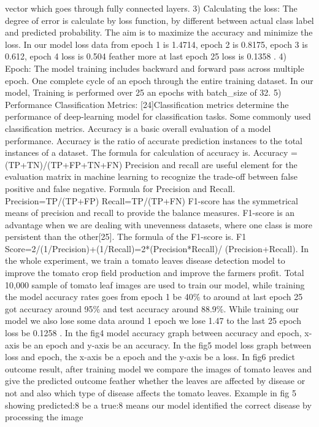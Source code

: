 \documentclass[conference]{IEEEtran}
\begin{document}
vector which goes through fully connected layers. 3) Calculating the loss: The degree of error is calculate by loss function, by different between actual class label and predicted probability. The aim is to maximize the accuracy and minimize the loss. In our model loss data from epoch 1 is 1.4714, epoch 2 is 0.8175, epoch 3 is 0.612, epoch 4 loss is 0.504 feather more at last epoch 25 loss is 0.1358 . 4) Epoch: The model training includes backward and forward pass across multiple epoch. One complete cycle of an epoch through the entire training dataset. In our model, Training is performed over 25 an epochs with batch\_size of 32. 5) Performance Classification Metrics: [24]Classification metrics determine the performance of deep-learning model for classification tasks. Some commonly used classification metrics. Accuracy is a basic overall evaluation of a model performance. Accuracy is the ratio of accurate prediction instances to the total instances of a dataset. The formula for calculation of accuracy is. Accuracy = (TP+TN)/(TP+FP+TN+FN) Precision and recall are useful element for the evaluation matrix in machine learning to recognize the trade-off between false positive and false negative. Formula for Precision and Recall. Precision=TP/(TP+FP) Recall=TP/(TP+FN) F1-score has the symmetrical means of precision and recall to provide the balance measures. F1-score is an advantage when we are dealing with unevenness datasets, where one class is more persistent than the other[25]. The formula of the F1-score is. F1 Score=2/(1/Precision)+(1/Recall)=2*(Precision*Recall)/ (Precision+Recall). In the whole experiment, we train a tomato leaves disease detection model to improve the tomato crop field production and improve the farmers profit. Total 10,000 sample of tomato leaf images are used to train our model, while training the model accuracy rates goes from epoch 1 be 40\% to around at last epoch 25 got accuracy around 95\% and test accuracy around 88.9\%. While training our model we also lose some data around 1 epoch we lose 1.47 to the last 25 epoch loss be 0.1258 . In the fig4 model accuracy graph between accuracy and epoch, x-axis be an epoch and y-axis be an accuracy. In the fig5 model loss graph between loss and epoch, the x-axis be a epoch and the y-axis be a loss. In fig6 predict outcome result, after training model we compare the images of tomato leaves and give the predicted outcome feather whether the leaves are affected by disease or not and also which type of disease affects the tomato leaves. Example in fig 5 showing predicted:8 be a true:8 means our model identified the correct disease by processing the image
\end{document}
